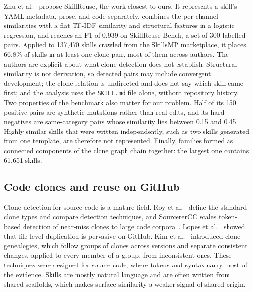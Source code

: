 Zhu et al.~\cite{zhu2026skillreuse} propose SkillReuse, the work closest to ours. It
represents a skill's YAML metadata, prose, and code separately, combines the per-channel
similarities with a flat TF-IDF similarity and structural features in a logistic regression,
and reaches an F1 of 0.939 on SkillReuse-Bench, a set of 300 labelled pairs. Applied to
137,470 skills crawled from the SkillsMP marketplace, it places 66.8\% of skills in at least
one clone pair, most of them across authors. The authors are explicit about what clone
detection does not establish. Structural similarity is not derivation, so detected pairs may
include convergent development; the clone relation is undirected and does not say which skill
came first; and the analysis uses the \texttt{SKILL.md} file alone, without repository
history. Two properties of the benchmark also matter for our problem. Half of its 150
positive pairs are synthetic mutations rather than real edits, and its hard negatives are
same-category pairs whose similarity lies between 0.15 and 0.45. Highly similar skills that
were written independently, such as two skills generated from one template, are therefore
not represented. Finally, families formed as connected components of the clone graph chain
together: the largest one contains 61,651 skills.

\subsection{Code clones and reuse on GitHub}

Clone detection for source code is a mature field. Roy et al.~\cite{roy2009comparison}
define the standard clone types and compare detection techniques, and SourcererCC scales
token-based detection of near-miss clones to large code corpora~\cite{sajnani2016sourcerercc}.
Lopes et al.~\cite{lopes2017dejavu} showed that file-level duplication is pervasive on GitHub.
Kim et al.~\cite{kim2005genealogy} introduced clone genealogies, which follow groups of
clones across versions and separate consistent changes, applied to every member of a group,
from inconsistent ones. These techniques were designed for source code, where tokens and
syntax carry most of the evidence. Skills are mostly natural language and are often written
from shared scaffolds, which makes surface similarity a weaker signal of shared origin.
